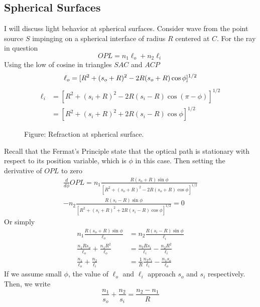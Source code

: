 \documentclass[../../../main.tex]{subfiles}
\begin{document}
\subsection{Spherical Surfaces}
I will discuss light behavior at spherical surfaces. Consider wave from the point source $S$ impinging on a spherical interface of radius $R$ centered at $C$. For the ray in question
\begin{equation*}
    OPL=n_1\ell_o+n_2\ell_i
\end{equation*}
Using the low of cosine in triangles $SAC$ and $ACP$
\begin{equation*}
    \ell_o=[R^2+(s_o+R)^2-2R(s_o+R)\cos \phi]^{1/2}\\
\end{equation*}
\begin{align*}
    \ell_i&=[R^2+(s_i+R)^2-2R(s_i-R)\cos (\pi-\phi)]^{1/2}\\
    &=[R^2+(s_i+R)^2+2R(s_i-R)\cos \phi]^{1/2}
\end{align*}

\begin{figure}[b]
    \centering
    \caption*{Figure: Refraction at spherical surface.}
\end{figure}

Recall that the Fermat’s Principle state that the optical path is stationary with respect to its position variable, which is $\phi$ in this case. Then setting the derivative of $OPL$ to zero 
\begin{multline*}
    \frac{d}{d\phi}OPL=n_1\frac{R(s_o+R)\sin \phi}{[R^2+(s_o+R)^2-2R(s_o+R)\cos \phi]^{1/2}}\\
    - n_2\frac{R(s_i-R)\sin \phi}{[R^2+(s_i+R)^2+2R(s_i-R)\cos \phi]^{1/2}}=0
\end{multline*}
Or simply
\begin{align*}
    n_1\frac{R(s_o+R)\sin \phi}{\ell_o}&=n_2\frac{R(s_i-R)\sin \phi}{\ell_i}\\
    \frac{n_1Rs_o}{\ell_o}+\frac{n_1R^2}{\ell_o}&=\frac{n_2Rs_i}{\ell_i}-\frac{n_2R^2}{\ell_i}\\
    \frac{n_1}{\ell_o}+\frac{n_2}{\ell_i}&=\frac{1}{R}\frac{n_2s_i}{\ell_i}-\frac{n_1s_o}{\ell_o}
\end{align*}
If we assume small $\phi$, the value of $\ell_o$ and $\ell_i$ approach $s_o$ and $s_i$ respectively. Then, we write
\begin{equation*}
    \frac{n_1}{s_o}+\frac{n_2}{s_i}=\frac{n_2-n_1}{R}
\end{equation*}
\end{document}
